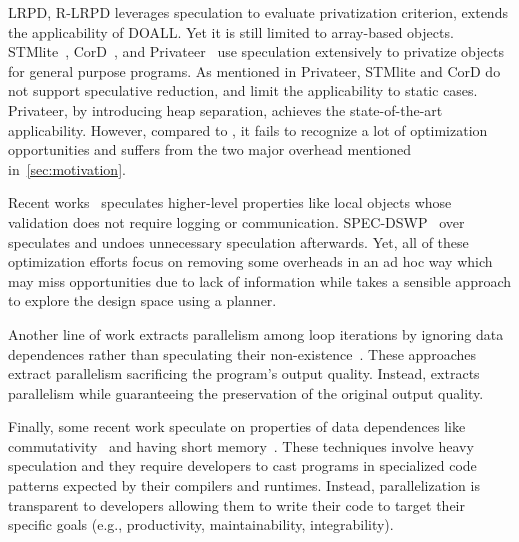 LRPD\cite{rauchwerger:99:pds}, R-LRPD\cite{dang:02:ipdps} leverages
speculation to evaluate privatization criterion, extends the applicability
of DOALL. Yet it is still limited to array-based objects.
STMlite~\cite{mehrara:09:stmlite}, CorD~\cite{tian:10:pldi}, and
Privateer~\cite{johnson:12:pldi} use speculation extensively to privatize
objects for general purpose programs. As mentioned in Privateer, STMlite
and CorD do not support speculative reduction, and limit the applicability
to static cases. Privateer, by introducing heap separation, achieves the
state-of-the-art applicability. However, compared to \namensp, it fails to
recognize a lot of optimization opportunities and suffers from the two
major overhead mentioned in~\cref{sec:motivation}.

Recent works~\cite{ctian:2008:micro,johnson:12:pldi,kim:12:cgo} speculates
higher-level properties like local objects whose validation does not
require logging or communication. SPEC-DSWP~\cite{vachharajani:07:pact}
over speculates and undoes unnecessary speculation afterwards. Yet, all of
these optimization efforts focus on removing some overheads in an ad hoc
way which may miss opportunities due to lack of information while
\name takes a sensible approach to explore the design space using a
planner.

Another line of work extracts parallelism among loop iterations by ignoring
data dependences rather than speculating their
non-existence~\cite{campanoni:2015:cgo,Udupa:2011:AEB:1993498.1993555,misailovic2013parallelizing}.
These approaches extract parallelism sacrificing the program's output
quality. Instead, \name extracts parallelism while guaranteeing the
preservation of the original output quality.

Finally, some recent work speculate on properties of data dependences like
commutativity~\cite{kulkarni:07:pldi,Nguyen:2014:DGO:2541940.2541964} and
having short memory~\cite{Deiana:2018:UPN:3173162.3173181}. These
techniques involve heavy speculation and they require developers to cast
programs in specialized code patterns expected by their compilers and
runtimes. Instead, \name parallelization is transparent to developers
allowing them to write their code to target their specific goals (e.g.,
productivity, maintainability, integrability).




